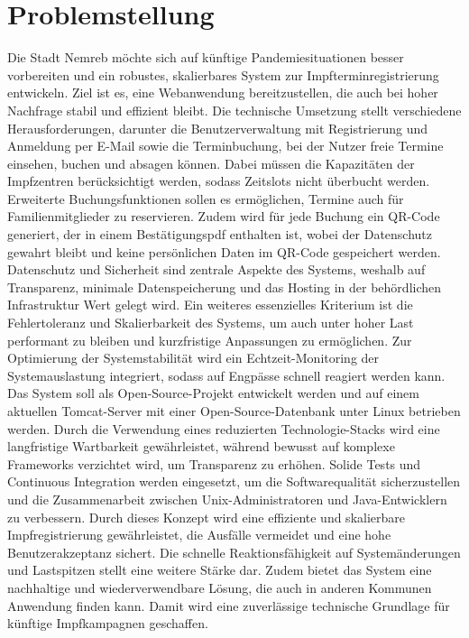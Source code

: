 \section*{Problemstellung}
Die Stadt Nemreb möchte sich auf künftige Pandemiesituationen besser vorbereiten und ein 
robustes, skalierbares System zur Impfterminregistrierung entwickeln. Ziel ist es, eine 
Webanwendung bereitzustellen, die auch bei hoher Nachfrage stabil und effizient bleibt. 
Die technische Umsetzung stellt verschiedene Herausforderungen, darunter die 
Benutzerverwaltung mit Registrierung und Anmeldung per E-Mail sowie die Terminbuchung, 
bei der Nutzer freie Termine einsehen, buchen und absagen können. Dabei müssen die 
Kapazitäten der Impfzentren berücksichtigt werden, sodass Zeitslots nicht überbucht werden.
Erweiterte Buchungsfunktionen sollen es ermöglichen, Termine auch für Familienmitglieder 
zu reservieren. Zudem wird für jede Buchung ein QR-Code generiert, der in einem 
Bestätigungspdf enthalten ist, wobei der Datenschutz gewahrt bleibt und keine 
persönlichen Daten im QR-Code gespeichert werden. Datenschutz und Sicherheit sind 
zentrale Aspekte des Systems, weshalb auf Transparenz, minimale Datenspeicherung und das 
Hosting in der behördlichen Infrastruktur Wert gelegt wird. Ein weiteres essenzielles 
Kriterium ist die Fehlertoleranz und Skalierbarkeit des Systems, um auch unter hoher Last 
performant zu bleiben und kurzfristige Anpassungen zu ermöglichen.
Zur Optimierung der Systemstabilität wird ein Echtzeit-Monitoring der Systemauslastung 
integriert, sodass auf Engpässe schnell reagiert werden kann. Das System soll als 
Open-Source-Projekt entwickelt werden und auf einem aktuellen Tomcat-Server mit einer 
Open-Source-Datenbank unter Linux betrieben werden. Durch die Verwendung eines 
reduzierten Technologie-Stacks wird eine langfristige Wartbarkeit gewährleistet, während 
bewusst auf komplexe Frameworks verzichtet wird, um Transparenz zu erhöhen. Solide Tests 
und Continuous Integration werden eingesetzt, um die Softwarequalität sicherzustellen und 
die Zusammenarbeit zwischen Unix-Administratoren und Java-Entwicklern zu verbessern.
Durch dieses Konzept wird eine effiziente und skalierbare Impfregistrierung 
gewährleistet, die Ausfälle vermeidet und eine hohe Benutzerakzeptanz sichert. Die 
schnelle Reaktionsfähigkeit auf Systemänderungen und Lastspitzen stellt eine weitere 
Stärke dar. Zudem bietet das System eine nachhaltige und wiederverwendbare Lösung, die 
auch in anderen Kommunen Anwendung finden kann. Damit wird eine zuverlässige technische 
Grundlage für künftige Impfkampagnen geschaffen.
